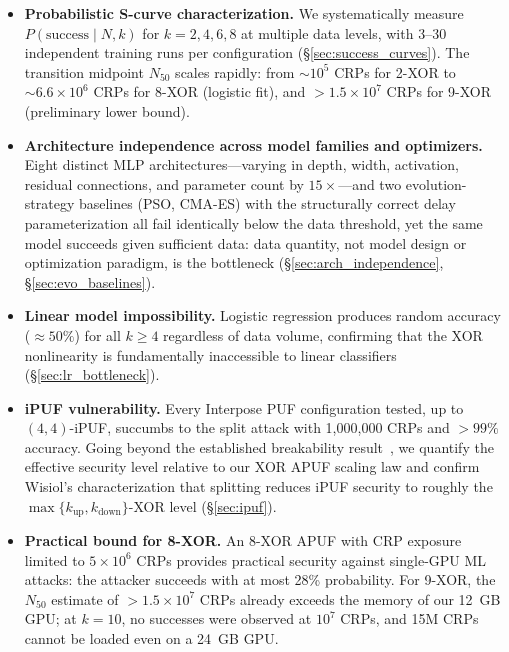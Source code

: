 \begin{itemize}
    \item \textbf{Probabilistic S-curve characterization.}  We systematically
    measure $P(\text{success} \mid N, k)$ for $k = 2, 4, 6, 8$ at
    multiple data levels, with 3--30 independent training runs per
    configuration (\S\ref{sec:success_curves}).  The transition midpoint
    $N_{50}$ scales rapidly: from $\sim 10^5$ CRPs for 2-XOR to
    $\sim 6.6 \times 10^6$ CRPs for 8-XOR (logistic fit), and
    $> 1.5 \times 10^7$ CRPs for 9-XOR (preliminary lower bound).

    \item \textbf{Architecture independence across model families and
    optimizers.}  Eight distinct MLP
    architectures---varying in depth, width, activation, residual
    connections, and parameter count by $15\times$---and two
    evolution-strategy baselines (PSO, CMA-ES) with the structurally correct
    delay parameterization all fail identically
    below the data threshold, yet the same model succeeds given sufficient
    data: data quantity, not model design or optimization paradigm, is the
    bottleneck (\S\ref{sec:arch_independence}, \S\ref{sec:evo_baselines}).

    \item \textbf{Linear model impossibility.}  Logistic regression produces
    random accuracy ($\approx 50\%$) for all $k \geq 4$ regardless of data
    volume, confirming that the XOR nonlinearity is fundamentally
    inaccessible to linear classifiers (\S\ref{sec:lr_bottleneck}).

    \item \textbf{iPUF vulnerability.}  Every Interpose PUF configuration
    tested, up to $(4,4)$-iPUF, succumbs to the split attack with
    1{,}000{,}000 CRPs and $> 99\%$ accuracy.  Going beyond the established
    breakability result~\cite{wisiol2020splitting}, we quantify the
    effective security level relative to our XOR APUF scaling law and confirm
    Wisiol's characterization that splitting reduces iPUF security to roughly
    the $\max\{k_{\text{up}},k_{\text{down}}\}$-XOR level (\S\ref{sec:ipuf}).

    \item \textbf{Practical bound for 8-XOR.}  An 8-XOR APUF with CRP
    exposure limited to $5 \times 10^6$ CRPs provides practical security
    against single-GPU ML attacks: the attacker succeeds with at most 28\%
    probability.  For 9-XOR, the $N_{50}$ estimate of $>1.5\times10^7$ CRPs
    already exceeds the memory of our 12~GB GPU; at $k = 10$, no successes were observed at
    $10^7$ CRPs, and 15M CRPs cannot be loaded even on a 24~GB GPU.
\end{itemize}

